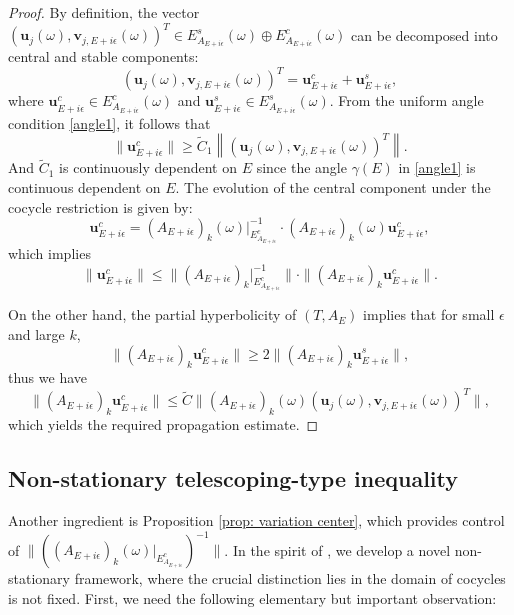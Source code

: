 \documentclass[11pt]{amsart}
\theoremstyle{remark}
\theoremstyle{definition}
\begin{document}
\begin{proof} By definition, the vector $ (\mathbf{u}_j(\omega), \mathbf{v}_{j,E+i\epsilon}(\omega))^{T} \in E^s_{A_{E+i\epsilon}}(\omega) \oplus E^c_{A_{E+i\epsilon}}(\omega) $ can be decomposed into central and stable components: $$
(\mathbf{u}_j(\omega), \mathbf{v}_{j,E+i\epsilon}(\omega))^{T} = \mathbf{u}^c_{E+i\epsilon} + \mathbf{u}^s_{E+i\epsilon},
$$ where $ \mathbf{u}^c_{E+i\epsilon} \in E^c_{A_{E+i\epsilon}}(\omega) $ and $ \mathbf{u}^s_{E+i\epsilon} \in E^s_{A_{E+i\epsilon}}(\omega) $. From the uniform angle condition \eqref{angle1}, it follows that $$
\|\mathbf{u}^c_{E+i\epsilon}\| \geq \tilde{C}_1 \left\| (\mathbf{u}_j(\omega), \mathbf{v}_{j,E+i\epsilon}(\omega))^{T} \right\|.
$$ And $\tilde{C}_1$ is continuously dependent on $E$ since the angle $\gamma(E)$ in \eqref{angle1} is continuous dependent on $E$. The evolution of the central component under the cocycle restriction is given by: $$
\mathbf{u}^c_{E+i\epsilon} = (A_{E+i\epsilon})_k(\omega)|_{E^c_{A_{E+i\epsilon}}}^{-1} \cdot (A_{E+i\epsilon})_k(\omega)\mathbf{u}^c_{E+i\epsilon},
$$ which implies $$
\|\mathbf{u}^c_{E+i\epsilon}\| \leq \| (A_{E+i\epsilon})_k|_{E^c_{A_{E+i\epsilon}}}^{-1} \| \cdot \| (A_{E+i\epsilon})_k\mathbf{u}^c_{E+i\epsilon} \|.
$$

On the other hand, the partial hyperbolicity of $ (T, A_{E}) $ implies that for small $ \epsilon $ and large $ k $, $$
\| (A_{E+i\epsilon})_k\mathbf{u}^c_{E+i\epsilon} \| \geq 2 \| (A_{E+i\epsilon})_k\mathbf{u}^s_{E+i\epsilon} \|,
$$ thus we have $$
\| (A_{E+i\epsilon})_k\mathbf{u}^c_{E+i\epsilon} \| \leq \tilde{C} \|(A_{E+i\epsilon})_k(\omega)(\mathbf{u}_j(\omega), \mathbf{v}_{j,E+i\epsilon}(\omega))^{T}\|,
$$ which yields the required propagation estimate. \end{proof}



\subsection{Non-stationary telescoping-type inequality}\label{telescoping}
Another ingredient is  Proposition \ref{prop: variation center}, which provides control of $\|((A_{E+i\epsilon})_k(\omega)|_{E^c_{A_{E+i\epsilon}}})^{-1}\|$. 
 In the spirit of \cite{Simon}, we develop a novel non-stationary framework, where the crucial distinction lies in the domain of cocycles is not fixed. First, we need the following elementary but important observation: 
\end{document}
